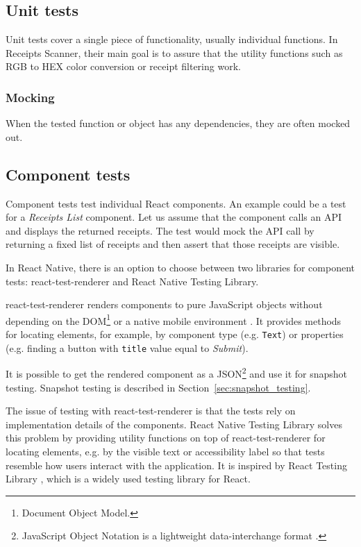 \documentclass[
  digital, %
  table,   %
  oneside, %
  lof,     %
  lot,     %
]{fithesis3}
\begin{document}
\subsection{Unit tests}
Unit tests cover a single piece of functionality, usually individual functions. In Receipts Scanner, their main goal is to assure that the utility functions such as RGB to HEX color conversion or receipt filtering work.

\subsubsection{Mocking}
When the tested function or object has any dependencies, they are often mocked out.

\subsection{Component tests}
Component tests test individual React components. An example could be a test for a \textit{Receipts List} component. Let us assume that the component calls an API and displays the returned receipts. The test would mock the API call by returning a fixed list of receipts and then assert that those receipts are visible. 

In React Native, there is an option to choose between two libraries for component tests: react-test-renderer and React Native Testing Library. 

react-test-renderer renders components to pure JavaScript objects without depending on the DOM\footnote{Document Object Model.} or a native mobile environment \cite{ReactTestRenderer}. It provides methods for locating elements, for example, by component type (e.g. \texttt{Text}) or properties (e.g. finding a button with \texttt{title} value equal to \textit{Submit}).

It is possible to get the rendered component as a JSON\footnote{JavaScript Object Notation is a lightweight data-interchange format \cite{Ecma2017JSON}.} and use it for snapshot testing. Snapshot testing is described in Section~\ref{sec:snapshot_testing}.

The issue of testing with react-test-renderer is that the tests rely on implementation details of the components. React Native Testing Library solves this problem by providing utility functions on top of react-test-renderer \cite{ReactNativeTestingLibrary} for locating elements, e.g. by the visible text or accessibility label so that tests resemble how users interact with the application. It is inspired by React Testing Library \cite{ReactNativeTestingLibrary}, which is a widely used testing library for React.
\end{document}
